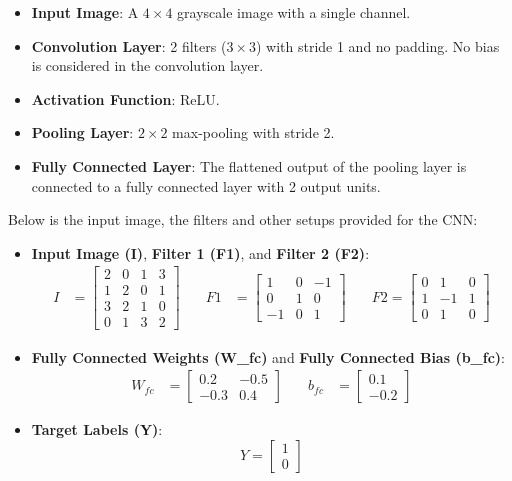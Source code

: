 \documentclass[a4 paper]{article}
\begin{document}
\begin{itemize}
    \item \textbf{Input Image}: A $4 \times 4$ grayscale image with a single channel.
    \item \textbf{Convolution Layer}: 2 filters ($3 \times 3$) with stride 1 and no padding. No bias is considered in the convolution layer.
    \item \textbf{Activation Function}: ReLU.
    \item \textbf{Pooling Layer}: $2 \times 2$ max-pooling with stride 2.
    \item \textbf{Fully Connected Layer}: The flattened output of the pooling layer is connected to a fully connected layer with 2 output units.
\end{itemize}

Below is the input image, the filters and other setups provided for the CNN:

\begin{itemize}
    \item \textbf{Input Image (I)}, \textbf{Filter 1 (F1)}, and \textbf{Filter 2 (F2)}:
    \[
    \begin{aligned}
    I &= \begin{bmatrix}
    2 & 0 & 1 & 3 \\
    1 & 2 & 0 & 1 \\
    3 & 2 & 1 & 0 \\
    0 & 1 & 3 & 2
    \end{bmatrix}
    \quad &
    F1 &= \begin{bmatrix}
    1 & 0 & -1 \\
    0 & 1 & 0 \\
    -1 & 0 & 1
    \end{bmatrix}
    \quad &
    F2 = \begin{bmatrix}
    0 & 1 & 0 \\
    1 & -1 & 1 \\
    0 & 1 & 0
    \end{bmatrix}
    \end{aligned}
    \]

    \item \textbf{Fully Connected Weights (W\_fc)} and \textbf{Fully Connected Bias (b\_fc)}:
    \[
    \begin{aligned}
    W_{fc} &= \begin{bmatrix}
    0.2 & -0.5 \\
    -0.3 & 0.4
    \end{bmatrix}
    \quad &
    b_{fc} &= \begin{bmatrix}
    0.1 \\
    -0.2
    \end{bmatrix}
    \end{aligned}
    \]

    \item \textbf{Target Labels (Y)}:
    \[
    Y = \begin{bmatrix}
    1 \\ 0
    \end{bmatrix}
    \]
\end{itemize}
\end{document}

